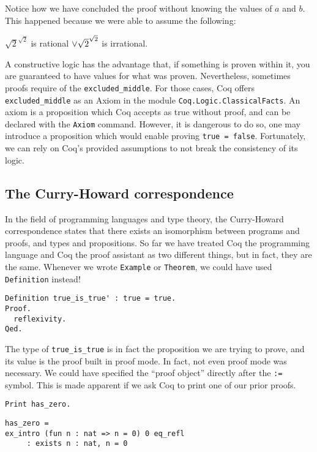 Notice how we have concluded the proof without knowing the values of $a$ and $b$. This happened because we
were able to assume the following: 
\begin{center}
$\sqrt{2}^{\sqrt{2}}$ is rational ${\Large{\vee}} \sqrt{2}^{\sqrt{2}}$ is  irrational.
\end{center}
\noindent A constructive logic has the advantage that, if something is proven within it, you are 
guaranteed to have values for what was proven. Nevertheless, sometimes proofs require of the 
\texttt{excluded_middle}. For those cases, Coq offers \texttt{excluded_middle}
as an Axiom in the module \texttt{Coq.Logic.ClassicalFacts}. An axiom is a proposition
which Coq accepts as true without proof, and can be declared with the \texttt{Axiom}
command. However, it is dangerous to do so, one may introduce a proposition which would enable 
proving \texttt{true = false}. Fortunately, we can rely on Coq's provided assumptions to
not break the consistency of its logic.


\subsection{The Curry-Howard correspondence}
\label{sect:curry-howard}

In the field of programming languages and type theory, the Curry-Howard correspondence states that there
exists an isomorphism between programs and proofs, and types and propositions. So far we have treated Coq
the programming language and Coq the proof assistant as two different things, but in fact, they are the 
same. Whenever we wrote \texttt{Example} or \texttt{Theorem}, we could have used
\texttt{Definition} instead!

\begin{verbatim}
Definition true_is_true' : true = true.
Proof.
  reflexivity.
Qed.
\end{verbatim}

The type of \texttt{true_is_true} is in fact the proposition we are trying to prove, and its 
value is the proof built in proof mode. In fact, not even proof mode was necessary. We could have 
specified the ``proof object'' directly after the \texttt{:=} symbol. This is made apparent if we
ask Coq to print one of our prior proofs.

\begin{verbatim}
Print has_zero. 
\end{verbatim}
\vspace{-\baselineskip*3/2}
\begin{verbatim}
has_zero = 
ex_intro (fun n : nat => n = 0) 0 eq_refl
     : exists n : nat, n = 0
\end{verbatim}


